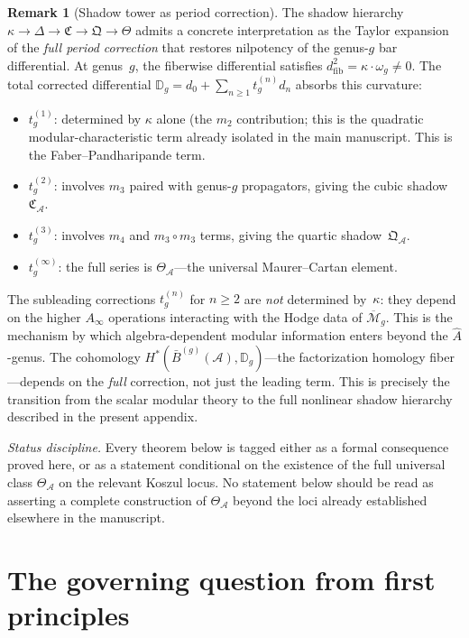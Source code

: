 \documentclass[11pt,oneside]{memoir}
\numberwithin{equation}{chapter}
\theoremstyle{definition}
\newtheorem{remark}[theorem]{Remark}
\newcommand{\cA}{\mathcal A}
\newcommand{\barB}{\bar{B}}
\newcommand{\Dg}[1]{\mathbb D_{#1}}
\begin{document}
\begin{remark}[Shadow tower as period correction]%
\label{rem:shadow-period-correction}%
%
The shadow hierarchy $\kappa \to \Delta \to \mathfrak{C}
\to \mathfrak{Q} \to \Theta$ admits a concrete interpretation
as the Taylor expansion of the \emph{full period correction}
that restores nilpotency of the genus-$g$ bar differential.
At genus~$g$, the fiberwise differential satisfies
$d_{\mathrm{fib}}^2 = \kappa \cdot \omega_g \neq 0$.
The total corrected differential
$\Dg{g} = d_0 + \sum_{n \geq 1} t_g^{(n)} d_n$
absorbs this curvature:
\begin{itemize}
\item $t_g^{(1)}$: determined by $\kappa$ alone (the $m_2$
  contribution; this is the quadratic modular-characteristic term already isolated in the main manuscript.
  This is the Faber--Pandharipande term.
\item $t_g^{(2)}$: involves $m_3$ paired with genus-$g$
  propagators, giving the cubic shadow~$\mathfrak{C}_{\cA}$.
\item $t_g^{(3)}$: involves $m_4$ and $m_3 \circ m_3$ terms,
  giving the quartic shadow~$\mathfrak{Q}_{\cA}$.
\item $t_g^{(\infty)}$: the full series is
  $\Theta_{\cA}$---the universal Maurer--Cartan element.
\end{itemize}
The subleading corrections $t_g^{(n)}$ for $n \geq 2$ are
\emph{not} determined by~$\kappa$: they depend on the
higher $A_\infty$ operations interacting with the Hodge data of
$\overline{\mathcal{M}}_g$.  This is the mechanism by which
algebra-dependent modular information enters beyond the
$\hat{A}$-genus.  The cohomology
$H^*(\barB^{(g)}(\cA), \Dg{g})$---the factorization homology
fiber---depends on the \emph{full} correction, not just the
leading term.  This is precisely the transition from the scalar modular theory to the full nonlinear shadow hierarchy described in the present appendix.
\end{remark}

\medskip
\noindent\emph{Status discipline.}
Every theorem below is tagged either as a formal consequence proved here, or as a statement conditional on the existence of the full universal class $\Theta_{\cA}$ on the relevant Koszul locus.  No statement below should be read as asserting a complete construction of $\Theta_{\cA}$ beyond the loci already established elsewhere in the manuscript.

\section{The governing question from first principles}
\label{sec:nms-governing-question}
\end{document}
